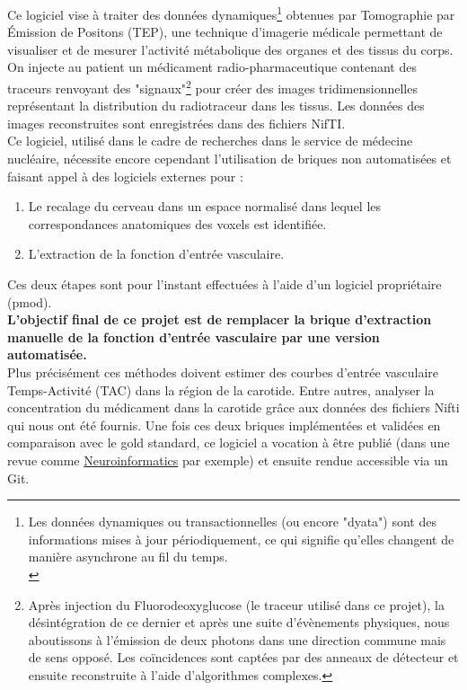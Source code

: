 \documentclass[a4paper]{article}
\begin{document}
    \noindent Ce logiciel vise à traiter des données dynamiques\footnote{Les données dynamiques ou transactionnelles (ou encore "dyata") sont des informations mises à jour périodiquement, ce qui signifie qu'elles changent de manière asynchrone au fil du temps.\\} obtenues par Tomographie par Émission de Positons (TEP), une technique d'imagerie médicale permettant de visualiser et de mesurer l'activité métabolique des organes et des tissus du corps. On injecte au patient un médicament radio-pharmaceutique contenant des traceurs renvoyant des "signaux"\footnote{Après injection du Fluorodeoxyglucose (le traceur utilisé dans ce projet), la désintégration de ce dernier et après une suite d'évènements physiques, nous aboutissons à l'émission de deux photons dans une direction commune mais de sens opposé. Les coïncidences sont captées par des anneaux de détecteur et ensuite reconstruite à l'aide d'algorithmes complexes.} pour créer des images tridimensionnelles représentant la distribution du radiotraceur dans les tissus.
    Les données des images reconstruites sont enregistrées dans des fichiers NifTI.\\
    
    \noindent Ce logiciel, utilisé dans le cadre de recherches dans le service de médecine nucléaire, nécessite encore cependant l'utilisation de briques non automatisées et faisant appel à des logiciels externes pour : 
    \begin{enumerate}
        \item Le recalage du cerveau dans un espace normalisé dans lequel les correspondances anatomiques des voxels est identifiée.
        \item L'extraction de la fonction d'entrée vasculaire.
    \end{enumerate}
    Ces deux étapes sont pour l'instant effectuées à l'aide d'un logiciel propriétaire (pmod). \\
    
    \noindent \textbf{L'objectif final de ce projet est de remplacer la brique d'extraction manuelle de la fonction d'entrée vasculaire par une version automatisée.}\\ 
    Plus précisément ces méthodes doivent estimer des courbes d'entrée vasculaire Temps-Activité (TAC) dans la région de la carotide. Entre autres, analyser la concentration du médicament dans la carotide grâce aux données des fichiers Nifti qui nous ont été fournis.
    Une fois ces deux briques implémentées et validées en comparaison avec le gold standard, ce logiciel a vocation à être publié (dans une revue comme \href{}{Neuroinformatics} par exemple) et ensuite rendue accessible via un Git.\\
\end{document}
